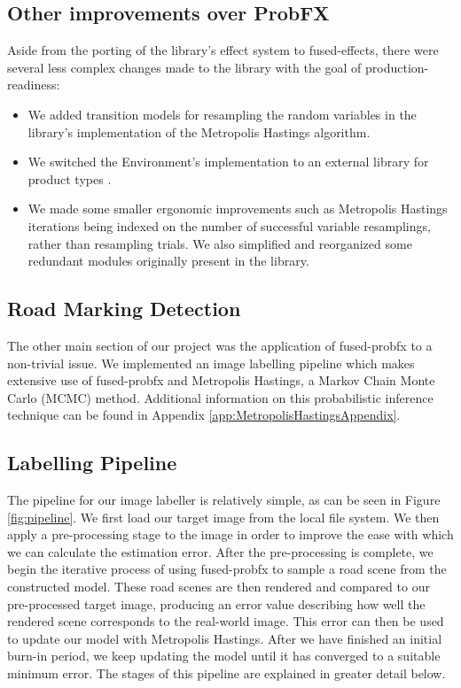 \documentclass[conference]{IEEEtran}
\begin{document}
\subsection*{Other improvements over ProbFX}
Aside from the porting of the library's effect system to fused-effects, there were several less complex changes made to the library with the goal of production-readiness:
\begin{itemize}
    \item We added transition models for resampling the random variables in the library's implementation of the Metropolis Hastings algorithm.    
    \item We switched the Environment's implementation to an external library for product types \cite{higherrinductivetypes}.
    \item We made some smaller ergonomic improvements such as Metropolis Hastings iterations being indexed on the number of successful variable resamplings, rather than resampling trials. We also simplified and reorganized some redundant modules originally present in the library. 
\end{itemize}

\subsection*{\textbf{Road Marking Detection}}

The other main section of our project was the application of fused-probfx to a non-trivial issue. We implemented an image labelling pipeline which makes extensive use of fused-probfx and Metropolis Hastings, a Markov Chain Monte Carlo (MCMC) method. Additional information on this probabilistic inference technique can be found in Appendix \ref{app:MetropolisHastingsAppendix}.

\subsection*{Labelling Pipeline}
The pipeline for our image labeller is relatively simple, as can be seen in Figure \ref{fig:pipeline}. We first load our target image from the local file system. We then apply a pre-processing stage to the image in order to improve the ease with which we can calculate the estimation error. After the pre-processing is complete, we begin the iterative process of using fused-probfx to sample a road scene from the constructed model. These road scenes are then rendered and compared to our pre-processed target image, producing an error value describing how well the rendered scene corresponds to the real-world image. This error can then be used to update our model with Metropolis Hastings. After we have finished an initial burn-in period, we keep updating the model until it has converged to a suitable minimum error. The stages of this pipeline are explained in greater detail below.
\end{document}
